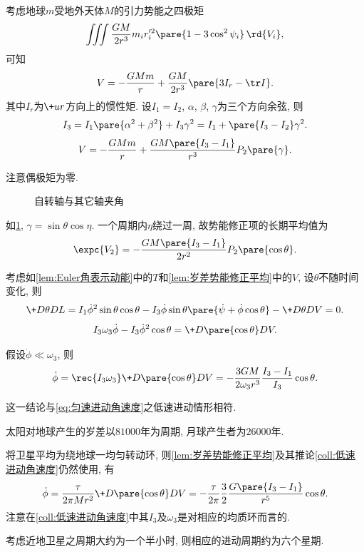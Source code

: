 \documentclass[../TheoreticalMechanics.tex]{subfiles}
\begin{document}
\begin{lemma}[二阶修正项]
    考虑地球$m$受地外天体$M$的引力势能之四极矩
    \[ \iiint \frac{GM}{2r^3}m_i r'^2_i\pare{1-3\cos^2\psi_i}\,\rd{V_i}, \]
    可知
    \[ V = -\frac{GMm}{r} + \frac{GM}{2r^3}\pare{3I_r - \tr I}. \]
    其中$I_r$为$\+ur$方向上的惯性矩. 设$I_1=I_2$, $\alpha$, $\beta$, $\gamma$为三个方向余弦, 则
    \[ I_3 = I_1\pare{\alpha^2+\beta^2} + I_3\gamma^2 = I_1+\pare{I_3 - I_2}\gamma^2. \]
    \[ V = -\frac{GMm}{r} + \frac{GM\pare{I_3 - I_1}}{r^3}P_2\pare{\gamma}. \]
\end{lemma}
\begin{remark}
    注意偶极矩为零.
\end{remark}
\begin{figure}[ht]
    \centering
    \caption{自转轴与其它轴夹角}
    \label{fig:自转轴与其它轴夹角}
\end{figure}
\begin{finale}
    \begin{lemma}[势能修正平均]
        \label{lem:岁差势能修正平均}
        如\cref{fig:自转轴与其它轴夹角}, $\gamma = \sin\theta\cos\eta$. 一个周期内$\eta$绕过一周, 故势能修正项的长期平均值为
        \[ \expc{V_2} = -\frac{GM\pare{I_3-I_1}}{2r^2}P_2\pare{\cos\theta}. \]
    \end{lemma}
\end{finale}
\begin{lemma}[岁差的Lagrange方程]
    考虑如\cref{lem:Euler角表示动能}中的$T$和\cref{lem:岁差势能修正平均}中的$V$, 设$\theta$不随时间变化, 则
    \[ \+D\theta DL = I_1 \dot{\phi}^2\sin\theta\cos\theta - I_3\dot{\phi}\sin\theta\pare{\dot{\psi} + \dot{\phi}\cos\theta} - \+D\theta DV = 0. \]
    \[ I_3 \omega_3 \dot{\phi} - I_3\dot{\phi}^2 \cos\theta = \+D{\pare{\cos\theta}}DV. \]
\end{lemma}
\begin{finale}
    \begin{corollary}[低速进动情形]
        \label{coll:低速进动角速度}
        假设$\dot{\phi} \ll \omega_3$, 则
        \[ \dot{\phi} = \rec{I_3\omega_3}\+D{\pare{\cos\theta}}DV = -\frac{3GM}{2\omega_3r^3}\frac{I_3-I_1}{I_3}\cos\theta. \]
    \end{corollary}
\end{finale}
\begin{remark}
    这一结论与\eqref{eq:匀速进动角速度}之低速进动情形相符.
\end{remark}
\begin{ex}[日月对地球之摄动]
    太阳对地球产生的岁差以$81000$年为周期, 月球产生者为$26000$年.
\end{ex}
\begin{theorem}[卫星轨道进动]
    将卫星平均为绕地球一均匀转动环, 则\cref{lem:岁差势能修正平均}及其推论\cref{coll:低速进动角速度}仍然使用, 有
    \[ \dot{\phi} = \frac{\tau}{2\pi Mr^2}\+D{\pare{\cos\theta}}DV = -\frac{\tau}{2\pi}\frac{3}{2}\frac{G\pare{I_3-I_1}}{r^5}\cos\theta. \]
    注意在\cref{coll:低速进动角速度}中其$I_3$及$\omega_3$是对相应的均质环而言的.
\end{theorem}
\begin{ex}[近地卫星轨道进动]
    考虑近地卫星之周期大约为一个半小时, 则相应的进动周期约为六个星期.
\end{ex}
\end{document}

